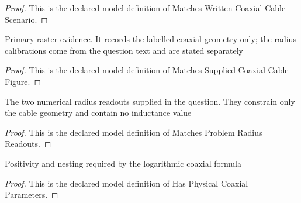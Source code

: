 \begin{proof}
  This is the declared model definition of Matches Written Coaxial Cable Scenario.
\end{proof}
\begin{definition}
  \label{def:physics:phyx-mini-0885:phyxminiproblems-problemphyxmini0885-matchessuppliedcoaxialcablefigure}
  Primary-raster evidence. It records the labelled coaxial geometry only; the radius calibrations come from the question text and are stated separately
\end{definition}
\begin{proof}
  This is the declared model definition of Matches Supplied Coaxial Cable Figure.
\end{proof}
\begin{definition}
  \label{def:physics:phyx-mini-0885:phyxminiproblems-problemphyxmini0885-matchesproblemradiusreadouts}
  The two numerical radius readouts supplied in the question. They constrain only the cable geometry and contain no inductance value
\end{definition}
\begin{proof}
  This is the declared model definition of Matches Problem Radius Readouts.
\end{proof}
\begin{definition}
  \label{def:physics:phyx-mini-0885:phyxminiproblems-problemphyxmini0885-hasphysicalcoaxialparameters}
  Positivity and nesting required by the logarithmic coaxial formula
\end{definition}
\begin{proof}
  This is the declared model definition of Has Physical Coaxial Parameters.
\end{proof}

